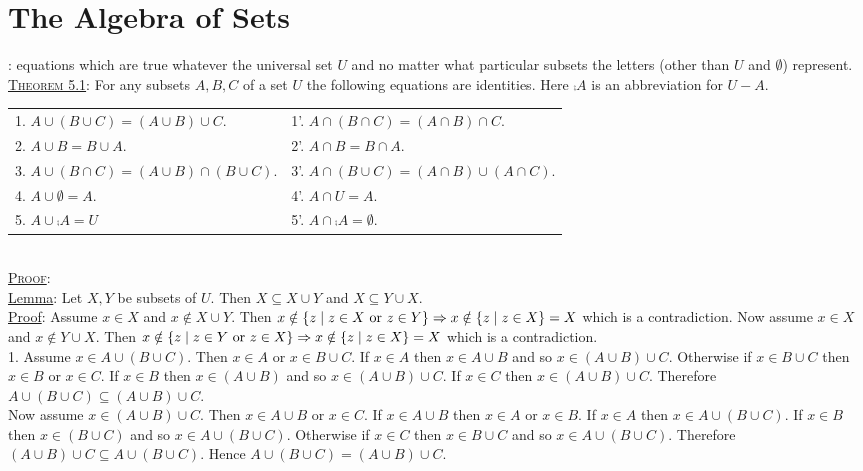 \documentclass[12pt]{book}
\begin{document}
\newpage

\section{The Algebra of Sets}
: equations which are true whatever the universal set $U$ and no matter what particular subsets the letters (other than $U$ and $\emptyset$) represent.\\ \linebreak
\underline{\textsc{Theorem 5.1}}: For any subsets $A, B, C$ of a set $U$ the following equations are identities. Here $\comp{A}$ is an abbreviation for $U - A$.
\begin{tabular}{ll}
1. $A \cup (B \cup C) = (A \cup B) \cup C$.& 1'. $A \cap (B \cap C) = (A \cap B) \cap C$.\\
2. $A \cup B = B \cup A$.& 2'. $A \cap B = B \cap A$.\\
3. $A \cup (B \cap C) = (A \cup B) \cap (B \cup C)$.& 3'. $A \cap (B \cup C) = (A \cap B) \cup (A \cap C)$.\\
4. $A \cup \emptyset = A$.& 4'. $A \cap U = A$.\\
5. $A \cup \comp{A} = U$& 5'. $A \cap \comp{A} = \emptyset$.
\end{tabular}\\
\underline{\textsc{Proof}}:\\
\small \underline{Lemma}: Let $X,Y$ be subsets of $U$. Then $X \subseteq X \cup Y$ and $X \subseteq Y \cup X$.\\ \underline{Proof}: Assume $x \in X$ and $x \notin X \cup Y$. Then $x \notin \{z \mid z \in X \text{ or } z \in Y\} \Rightarrow x \notin \{z \mid z \in X\} = X$ which is a contradiction. Now assume $x \in X$ and $x \notin Y \cup X$. Then $x \notin \{z \mid z \in Y \text{ or } z \in X\} \Rightarrow x \notin \{z \mid z \in X\} = X$ which is a contradiction.\\ \normalsize
1. Assume $x \in A \cup (B \cup C)$. Then $x \in A$ or $x \in B \cup C$. If $x \in A$ then $x \in A \cup B$ and so $x \in (A \cup B) \cup C$. Otherwise if $x \in B \cup C$ then $x \in B$ or $x \in C$. If $x \in B$ then $x \in (A \cup B)$ and so $x \in (A \cup B) \cup C$. If $x \in C$ then $x \in (A \cup B) \cup C$. Therefore $A \cup (B \cup C) \subseteq (A \cup B) \cup C$.\\ Now assume $x \in (A \cup B) \cup C$. Then $x \in A \cup B$ or $x \in C$. If $x \in A \cup B$ then $x \in A$ or $x \in B$. If $x \in A$ then $x \in A \cup (B \cup C)$. If $x \in B$ then $x \in (B \cup C)$ and so $x \in A \cup (B \cup C)$. Otherwise if $x \in C$ then $x \in B \cup C$ and so $x \in A \cup (B \cup C)$. Therefore $(A \cup B) \cup C \subseteq A \cup (B \cup C)$. Hence $A \cup (B \cup C) = (A \cup B) \cup C$.\\
\end{document}
